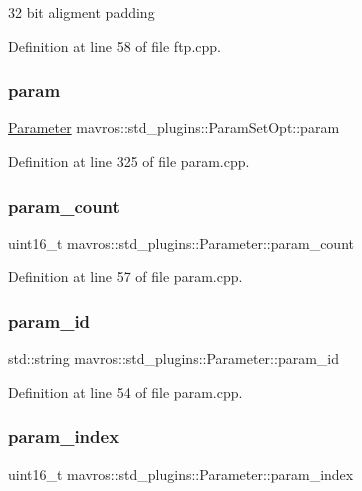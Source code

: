 32 bit aligment padding 



Definition at line 58 of file ftp.\+cpp.

\mbox{\label{group__plugin_ga76100850b31cc9972cb5ce440d1a4684}} 
\subsubsection{\texorpdfstring{param}{param}}
{\footnotesize\ttfamily \mbox{\hyperlink{classmavros_1_1std__plugins_1_1Parameter}{Parameter}} mavros\+::std\+\_\+plugins\+::\+Param\+Set\+Opt\+::param}



Definition at line 325 of file param.\+cpp.

\mbox{\label{group__plugin_ga962048d830e7dea388e9c9956e1a5b1b}} 
\subsubsection{\texorpdfstring{param\_count}{param\_count}}
{\footnotesize\ttfamily uint16\+\_\+t mavros\+::std\+\_\+plugins\+::\+Parameter\+::param\+\_\+count}



Definition at line 57 of file param.\+cpp.

\mbox{\label{group__plugin_ga6e9b1d000a31b2ca2773ff03c28980da}} 
\subsubsection{\texorpdfstring{param\_id}{param\_id}}
{\footnotesize\ttfamily std\+::string mavros\+::std\+\_\+plugins\+::\+Parameter\+::param\+\_\+id}



Definition at line 54 of file param.\+cpp.

\mbox{\label{group__plugin_ga531408831574f2bcf7311ddae08a1b1e}} 
\subsubsection{\texorpdfstring{param\_index}{param\_index}}
{\footnotesize\ttfamily uint16\+\_\+t mavros\+::std\+\_\+plugins\+::\+Parameter\+::param\+\_\+index}



